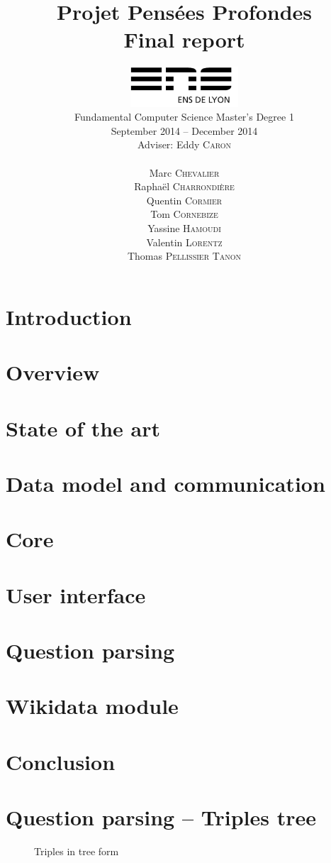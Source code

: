 \documentclass[a4paper,10pt]{report}
\title{Projet Pensées Profondes\\\large Final report}
\author{\includegraphics[width=0.3\textwidth]{../logo_ensl.pdf}\\[50pt]
Fundamental Computer Science Master's Degree 1\\September 2014 \--- December 2014\\[50pt]
Adviser: Eddy \textsc{Caron}\\[50pt]
\begin{minipage}{0.4\textwidth}
    \begin{flushleft} \large
        Marc \textsc{Chevalier}
        \\
        Raphaël \textsc{Charrondière}
        \\
        Quentin \textsc{Cormier}
        \\
        Tom \textsc{Cornebize}
    \end{flushleft}
\end{minipage}
\begin{minipage}{0.4\textwidth}
    \begin{flushright} \large
        Yassine \textsc{Hamoudi}
        \\
        Valentin \textsc{Lorentz}
        \\
        Thomas \textsc{Pellissier Tanon}
        \\
    \end{flushright}
\end{minipage}
}
\date{}
\begin{document}
\maketitle



\tableofcontents

\chapter*{Introduction}
    

\chapter{Overview}
    

\chapter{State of the art}
    

\chapter{Data model and communication}
    

\chapter{Core}
    

\chapter{User interface}
    

\chapter{Question parsing}
    
    
    
    

\chapter{Wikidata module}
    

\chapter*{Conclusion}
    

\appendix



\nocite{*}

\chapter{Question parsing \--- Triples tree}

\begin{figure}[!ht]
\caption{Triples in tree form}
\label{triple_tree}

\end{figure}
\end{document}
